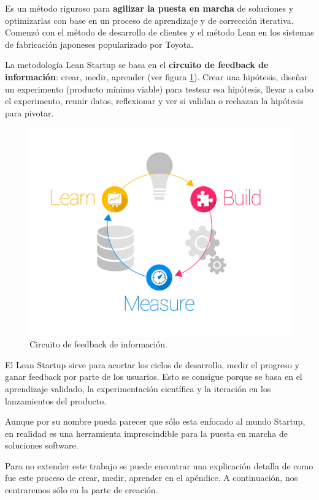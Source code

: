 \documentclass[12pt,twoside,titlepage]{report}
\begin{document}
Es un método riguroso para \textbf{agilizar la puesta en marcha} de soluciones y optimizarlas con base en un proceso de aprendizaje y de corrección iterativa. Comenzó con el método de desarrollo de clientes y el método Lean en los sistemas de fabricación japoneses popularizado por Toyota.

La metodología Lean Startup se basa en el \textbf{circuito de feedback de información}: crear, medir, aprender (ver figura \ref{fig:LeanStartup}). Crear una hipótesis, diseñar un experimento (producto mínimo viable) para testear esa hipótesis, llevar a cabo el experimento, reunir datos, reflexionar y ver si validan o rechazan la hipótesis para pivotar.

\begin{figure}[H]
    \centering
    \includegraphics[scale=0.3]{Lean Startup/CircuitoFeedback}
    \caption{Circuito de feedback de información.}
    \label{fig:LeanStartup}
\end{figure}

El Lean Startup sirve para acortar los ciclos de desarrollo, medir el progreso y ganar feedback por parte de los usuarios. Esto se consigue porque se basa en el aprendizaje validado, la experimentación científica y la iteración en los lanzamientos del producto. 

Aunque por su nombre pueda parecer que sólo esta enfocado al mundo Startup, en realidad es una herramienta imprescindible para la puesta en marcha de soluciones software. 

Para no extender este trabajo se puede encontrar una explicación detalla de como fue este proceso de crear, medir, aprender en el apéndice. A continuación, nos centraremos sólo en la parte de creación.
\end{document}
